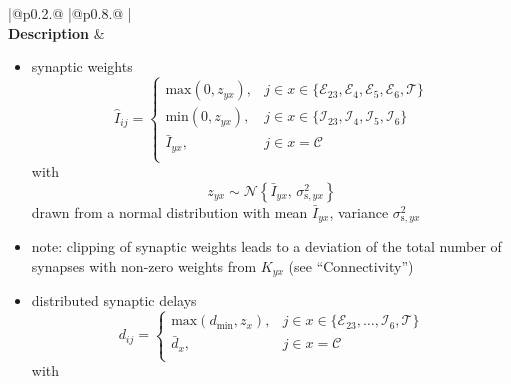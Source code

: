 \documentclass[10pt,a4paper,twoside,american]{article}
\theoremstyle{definitionstyle}
\begin{document}
\clearpage
\begin{table}
\begin{tabular}{
  |@{\hspace*{\marg}}p{}@{\hspace*{\marg}}
  |@{\hspace*{\marg}}p{}@{\hspace*{\marg}}
  |}
  \hline 
  \\
  \hline 
  \textbf{Description} &
  \begin{itemize}
  \item synaptic weights
  \begin{equation*}
	  \hat{I}_{ij} = \begin{cases} 
      \text{max}(0,z_{yx}), & j \in x\in\{\mathcal{E}_{23},\mathcal{E}_{4},\mathcal{E}_{5},\mathcal{E}_{6},\mathcal{T}\} \\
      \text{min}(0,z_{yx}), & j \in x\in\{\mathcal{I}_{23},\mathcal{I}_{4},\mathcal{I}_{5},\mathcal{I}_{6}\} \\
      \bar{I}_{yx}, & j \in x=\mathcal{C} \\
      \end{cases}
  \end{equation*}
  with
  \begin{equation*}
      z_{yx} \sim\mathcal{N}\left\{\bar{I}_{yx},\,\sigma_{\text{s},yx}^2\right\}
  \end{equation*}
  drawn from a normal distribution with mean $\bar{I}_{yx}$, variance $\sigma_{\text{s},yx}^2$
  \item[] note: clipping of synaptic weights leads to a deviation of the total number of synapses with non-zero weights from $K_{yx}$ (see ``Connectivity'')
  \item distributed synaptic delays
  \begin{equation*}
      d_{ij} = \begin{cases} 
	      \text{max}(d_\text{min},z_{x}), & j \in x\in\{\mathcal{E}_{23},\ldots,\mathcal{I}_{6},\mathcal{T}\} \\
      	\bar{d}_{x}, & j \in x=\mathcal{C} \\
      \end{cases}
  \end{equation*}
  with
  \begin{equation*}

\end{equation*}
\end{itemize}
\end{tabular}
\end{table}
\end{document}
